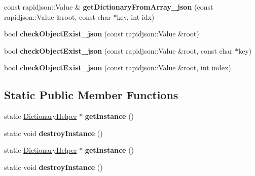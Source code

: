 \begin{DoxyCompactItemize}
const rapidjson\+::\+Value \& {\bfseries get\+Dictionary\+From\+Array\+\_\+json} (const rapidjson\+::\+Value \&root, const char $\ast$key, int idx)
\item 
\mbox{\label{classcocostudio_1_1DictionaryHelper_a3d1a9a302d8bf1c41053ea616f41539a}} 
bool {\bfseries check\+Object\+Exist\+\_\+json} (const rapidjson\+::\+Value \&root)
\item 
\mbox{\label{classcocostudio_1_1DictionaryHelper_a5991f88c3c4d93d711bd568bbcd20013}} 
bool {\bfseries check\+Object\+Exist\+\_\+json} (const rapidjson\+::\+Value \&root, const char $\ast$key)
\item 
\mbox{\label{classcocostudio_1_1DictionaryHelper_af8bc05deb348d3227899095e8296a9ff}} 
bool {\bfseries check\+Object\+Exist\+\_\+json} (const rapidjson\+::\+Value \&root, int index)
\end{DoxyCompactItemize}
\subsection*{Static Public Member Functions}
\begin{DoxyCompactItemize}
\item 
\mbox{\label{classcocostudio_1_1DictionaryHelper_ae3f14a50e8ed47e5c0c86d31516fde1b}} 
static \hyperlink{classcocostudio_1_1DictionaryHelper}{Dictionary\+Helper} $\ast$ {\bfseries get\+Instance} ()
\item 
\mbox{\label{classcocostudio_1_1DictionaryHelper_a19d962c902be8377702da570c2bd9d87}} 
static void {\bfseries destroy\+Instance} ()
\item 
\mbox{\label{classcocostudio_1_1DictionaryHelper_a000710594f800f5ad7b2b313e2d03c53}} 
static \hyperlink{classcocostudio_1_1DictionaryHelper}{Dictionary\+Helper} $\ast$ {\bfseries get\+Instance} ()
\item 
\mbox{\label{classcocostudio_1_1DictionaryHelper_ad748f6a38060ef4331783f29f9c8480f}} 
static void {\bfseries destroy\+Instance} ()
\end{DoxyCompactItemize}


